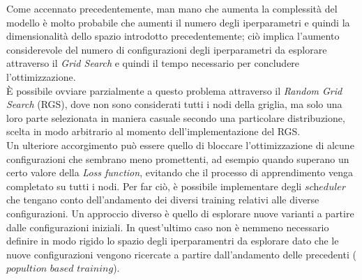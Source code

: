 Come accennato precedentemente, man mano che aumenta la complessità del modello è molto probabile che aumenti il numero degli iperparametri e quindi la dimensionalità dello spazio introdotto precedentemente; ciò implica l'aumento considerevole del numero di configurazioni degli iperparametri da esplorare attraverso il \textit{Grid Search} e quindi il tempo necessario per concludere l'ottimizzazione.\\
È possibile ovviare parzialmente a questo problema attraverso il \textit{Random Grid Search} (RGS), dove non sono considerati tutti i nodi della griglia, ma solo una loro parte selezionata in maniera casuale secondo una particolare distribuzione, scelta in modo arbitrario al momento dell'implementazione del RGS. \\
Un ulteriore accorgimento può  essere quello di bloccare l'ottimizzazione di alcune configurazioni che sembrano meno promettenti, ad esempio quando superano un certo valore della \textit{Loss function}, evitando che il processo di apprendimento venga completato su tutti i nodi. Per far ciò, è possibile implementare degli $\textit{scheduler}$ che tengano conto dell'andamento dei diversi training relativi alle diverse configurazioni. Un approccio diverso è quello di esplorare nuove varianti a partire dalle configurazioni iniziali. In quest'ultimo caso non è nemmeno necessario definire in modo rigido lo spazio degli iperparamentri da esplorare dato che le nuove configurazioni vengono ricercate a partire dall'andamento delle precedenti ($\textit{popultion based training}$).

\newpage


